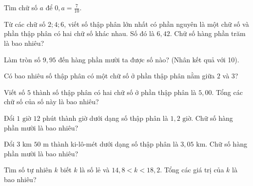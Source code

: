\begin{ex}
  Tìm chữ số $a$ để $0{,}a = \frac{7}{10}$.
\end{ex}

\begin{ex}
  Từ các chữ số $2; 4; 6$, viết số thập phân lớn nhất có phần nguyên là một chữ số và phần thập phân có hai chữ số khác nhau. Số đó là $6{,}42$. Chữ số hàng phần trăm là bao nhiêu?
\end{ex}

\begin{ex}
  Làm tròn số $9{,}95$ đến hàng phần mười ta được số nào? (Nhân kết quả với 10).
\end{ex}

\begin{ex}
  Có bao nhiêu số thập phân có một chữ số ở phần thập phân nằm giữa $2$ và $3$?
\end{ex}

\begin{ex}
  Viết số $5$ thành số thập phân có hai chữ số ở phần thập phân là $5{,}00$. Tổng các chữ số của số này là bao nhiêu?
\end{ex}

\begin{ex}
  Đổi $1\text{ giờ } 12\text{ phút}$ thành giờ dưới dạng số thập phân là $1{,}2\text{ giờ}$. Chữ số hàng phần mười là bao nhiêu?
\end{ex}

\begin{ex}
  Đổi $3\text{ km } 50\text{ m}$ thành ki-lô-mét dưới dạng số thập phân là $3{,}05\text{ km}$. Chữ số hàng phần mười là bao nhiêu?
\end{ex}

\begin{ex}
  Tìm số tự nhiên $k$ biết $k$ là số lẻ và $14{,}8 < k < 18{,}2$. Tổng các giá trị của $k$ là bao nhiêu?
\end{ex}
